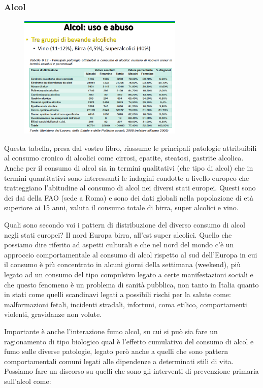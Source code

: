 \subsubsection{Alcol} 

\begin{figure}[!ht]
\centering
	\includegraphics[width=0.7\textwidth]{17/image5.png}
	\end{figure}

Questa tabella, presa dal vostro libro, riassume le principali patologie
attribuibili al consumo cronico di alcolici come cirrosi, epatite,
steatosi, gastrite alcolica. Anche per il consumo di alcol sia in
termini qualitativi (che tipo di alcol) che in termini quantitativi sono
interessanti le indagini condotte a livello europeo che tratteggiano
l'abitudine al consumo di alcol nei diversi stati europei. Questi sono
dei dai della FAO (sede a Roma) e sono dei dati globali nella
popolazione di età superiore ai 15 anni, valuta il consumo totale di
birra, super alcolici e vino.

Quali sono secondo voi i pattern di distribuzione del diverso consumo di
alcol negli stati europei? Il nord Europa birra, all'est super alcolici.
Quello che possiamo dire riferito ad aspetti culturali e che nel nord
del mondo c'è un approccio comportamentale al consumo di alcol rispetto
al sud dell'Europa in cui il consumo è più concentrato in alcuni giorni
della settimana (weekend), più legato ad un consumo del tipo compulsivo
legato a certe manifestazioni sociali e che questo fenomeno è un
problema di sanità pubblica, non tanto in Italia quanto in stati come
quelli scandinavi legati a possibili rischi per la salute come:
malformazioni fetali, incidenti stradali, infortuni, coma etilico,
comportamenti violenti, gravidanze non volute.

Importante è anche l'interazione fumo alcol, su cui si può sia fare un
ragionamento di tipo biologico qual è l'effetto cumulativo del consumo
di alcol e fumo sulle diverse patologie, legato però anche a quelli che
sono pattern comportamentali comuni legati alle dipendenze a determinati
stili di vita. Possiamo fare un discorso su quelli che sono gli
interventi di prevenzione primaria sull'alcol come:

